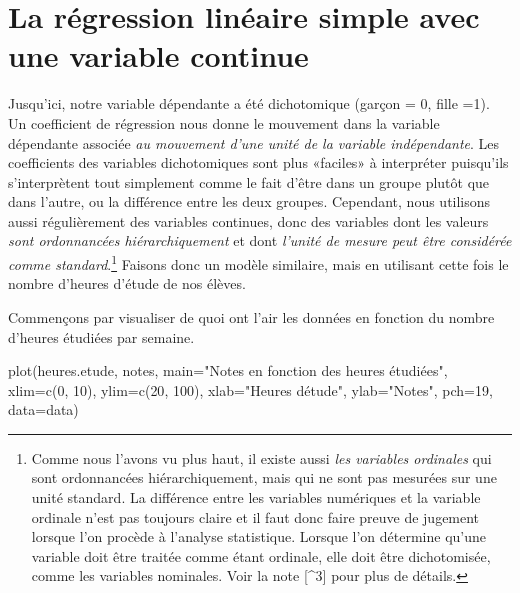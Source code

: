 \documentclass[
]{book}
\newenvironment{Shaded}{\begin{snugshade}}{\end{snugshade}}
\newcommand{\AttributeTok}[1]{\textcolor[rgb]{0.77,0.63,0.00}{#1}}
\newcommand{\DecValTok}[1]{\textcolor[rgb]{0.00,0.00,0.81}{#1}}
\newcommand{\FunctionTok}[1]{\textcolor[rgb]{0.00,0.00,0.00}{#1}}
\newcommand{\NormalTok}[1]{#1}
\newcommand{\StringTok}[1]{\textcolor[rgb]{0.31,0.60,0.02}{#1}}
\begin{document}
\hypertarget{la-ruxe9gression-linuxe9aire-simple-avec-une-variable-continue}{%
\section{La régression linéaire simple avec une variable continue}\label{la-ruxe9gression-linuxe9aire-simple-avec-une-variable-continue}}

Jusqu'ici, notre variable dépendante a été dichotomique (garçon = 0, fille =1). Un coefficient de régression nous donne le mouvement dans la variable dépendante associée \emph{au mouvement d'une unité de la variable indépendante}. Les coefficients des variables dichotomiques sont plus «faciles» à interpréter puisqu'ils s'interprètent tout simplement comme le fait d'être dans un groupe plutôt que dans l'autre, ou la différence entre les deux groupes. Cependant, nous utilisons aussi régulièrement des variables continues, donc des variables dont les valeurs \emph{sont ordonnancées hiérarchiquement} et dont \emph{l'unité de mesure peut être considérée comme standard}.\footnote{Comme nous l'avons vu plus haut, il existe aussi \emph{les variables ordinales} qui sont ordonnancées hiérarchiquement, mais qui ne sont pas mesurées sur une unité standard. La différence entre les variables numériques et la variable ordinale n'est pas toujours claire et il faut donc faire preuve de jugement lorsque l'on procède à l'analyse statistique. Lorsque l'on détermine qu'une variable doit être traitée comme étant ordinale, elle doit être dichotomisée, comme les variables nominales. Voir la note {[}\^{}3{]} pour plus de détails.} Faisons donc un modèle similaire, mais en utilisant cette fois le nombre d'heures d'étude de nos élèves.

Commençons par visualiser de quoi ont l'air les données en fonction du nombre d'heures étudiées par semaine.

\begin{Shaded}
\begin{Highlighting}[]
\FunctionTok{plot}\NormalTok{(heures.etude, notes, }\AttributeTok{main=}\StringTok{"Notes en fonction des heures étudiées"}\NormalTok{,}
     \AttributeTok{xlim=}\FunctionTok{c}\NormalTok{(}\DecValTok{0}\NormalTok{, }\DecValTok{10}\NormalTok{), }\AttributeTok{ylim=}\FunctionTok{c}\NormalTok{(}\DecValTok{20}\NormalTok{, }\DecValTok{100}\NormalTok{),}
    \AttributeTok{xlab=}\StringTok{"Heures d\textquotesingle{}étude"}\NormalTok{, }\AttributeTok{ylab=}\StringTok{"Notes"}\NormalTok{, }\AttributeTok{pch=}\DecValTok{19}\NormalTok{, }\AttributeTok{data=}\NormalTok{data)}
\end{Highlighting}
\end{Shaded}
\end{document}
